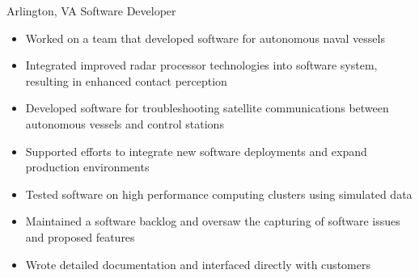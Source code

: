 
        {Arlington, VA}
        {Software Developer}
        {}{
    \begin{itemize}
        \item Worked on a team that developed software for autonomous naval vessels 
        \item Integrated improved radar processor technologies into software system, resulting in enhanced contact perception 
        \item Developed software for troubleshooting satellite communications between autonomous vessels and control stations
        \item Supported efforts to integrate new software deployments and expand production environments
        \item Tested software on high performance computing clusters using simulated data
        \item Maintained a software backlog and oversaw the capturing of software issues and proposed features 
        \item Wrote detailed documentation and interfaced directly with customers
    \end{itemize}
}
